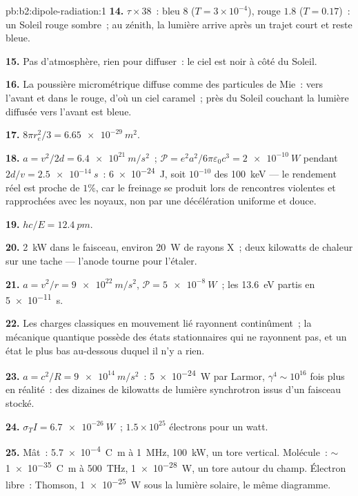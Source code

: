 \begin{solution}{pb:b2:dipole-radiation:1}
\textbf{14.} $\tau \times 38$~: bleu $8$ ($T = 3 \times 10^{-4}$), rouge $1.8$ ($T = 0.17$)~: un Soleil
rouge sombre~; au zénith, la lumière arrive après un trajet court et reste bleue.

\textbf{15.} Pas d'atmosphère, rien pour diffuser~: le ciel est noir à côté
du Soleil.

\textbf{16.} La poussière micrométrique diffuse comme des particules de Mie~: vers l'avant et
dans le rouge, d'où un ciel caramel~; près du Soleil couchant la lumière
diffusée vers l'avant est bleue.

\textbf{17.} $8\pi r_e^2/3 = \qty{6.65e-29}{m^2}$.

\textbf{18.} $a = v^2/2d = \qty{6.4e21}{m/s^2}$~; $\mathcal P = e^2a^2/6\pi\varepsilon_0c^3 =
\qty{2e-10}{W}$ pendant $2d/v = \qty{2.5e-14}{s}$~: \qty{6e-24}{J}, soit $10^{-10}$ des
\qty{100}{keV} --- le rendement réel est proche de $1\%$, car le freinage se produit
lors de rencontres violentes et rapprochées avec les noyaux, non par une décélération
uniforme et douce.

\textbf{19.} $hc/E = \qty{12.4}{pm}$.

\textbf{20.} \qty{2}{kW} dans le faisceau, environ \qty{20}{W} de rayons X~; deux kilowatts
de chaleur sur une tache --- l'anode tourne pour l'étaler.

\textbf{21.} $a = v^2/r = \qty{9e22}{m/s^2}$, $\mathcal P = \qty{5e-8}{W}$~; les \qty{13.6}{eV} partis
en \qty{5e-11}{s}.

\textbf{22.} Les charges classiques en mouvement lié rayonnent continûment~;
la mécanique quantique possède des états stationnaires qui ne rayonnent pas, et un état le plus bas
au-dessous duquel il n'y a rien.

\textbf{23.} $a = c^2/R = \qty{9e14}{m/s^2}$~: \qty{5e-24}{W} par Larmor, $\gamma^4 \sim 10^{16}$
fois plus en réalité~: des dizaines de kilowatts de lumière synchrotron issus d'un
faisceau stocké.

\textbf{24.} $\sigma_TI = \qty{6.7e-26}{W}$~; $1.5 \times 10^{25}$ électrons pour un watt.

\textbf{25.} Mât~: \qty{5.7e-4}{C.m} à \qty{1}{MHz}, \qty{100}{kW}, un tore
vertical. Molécule~: $\sim$\qty{1e-35}{C.m} à \qty{500}{THz}, \qty{1e-28}{W},
un tore autour du champ. Électron libre~: Thomson, \qty{1e-25}{W} sous
la lumière solaire, le même diagramme.
\end{solution}

